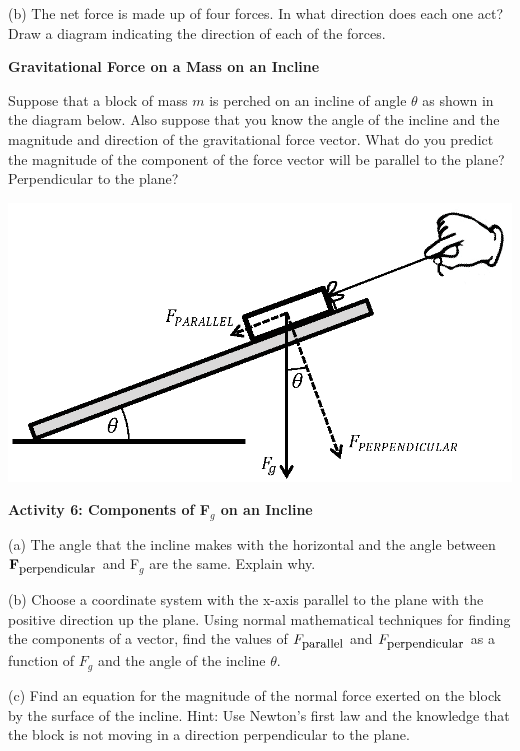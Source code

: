 (b) The net force is made up of four forces.  
In what direction does each one act? Draw a
diagram indicating the direction of each of the forces.
\answerspace{20mm}

\pagebreak[2]
\textbf{Gravitational Force on a Mass on an Incline }

Suppose that a block of mass $m$ is perched on an incline of angle \( \theta  \)
as shown in the diagram below. Also suppose that you know the angle of the incline
and the magnitude and direction of the gravitational force vector. What do you
predict the magnitude of the component of the force vector will be parallel
to the plane? Perpendicular to the plane?

\vspace{0.3cm}
{\par\centering \includegraphics{newton/newton_fig10_new.eps} \par}
\vspace{0.3cm}

\textbf{Activity 6: Components of F$_{g}$ on an Incline }

(a) The angle that the incline makes with the horizontal and the angle between
\( {\bf F}_{{\mbox{\small perpendicular}}} \) and F\( _{g} \) are the same. Explain why.
\vspace{20mm}

(b) Choose a coordinate system with the x-axis parallel to the plane with the
positive direction up the plane. Using normal mathematical techniques for finding the components of a vector, find the values of 
\( F_{\mbox{\small parallel}} \) and \( F_{\mbox{\small perpendicular}} \)
as a function of \( F_{g} \) and the angle of the incline \( \theta  \).
\vspace{20mm}

(c) Find an equation for the magnitude of the normal force exerted on the
block by the surface of the incline. Hint: Use Newton's first law and the knowledge that the block is not moving in a direction perpendicular to the plane.

